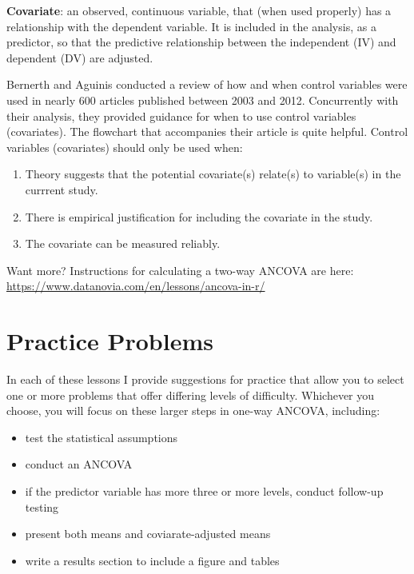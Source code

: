 \documentclass[
  11pt,
]{book}
\providecommand{\tightlist}{%
  \setlength{\itemsep}{0pt}\setlength{\parskip}{0pt}}
\begin{document}
\textbf{Covariate}: an observed, continuous variable, that (when used properly) has a relationship with the dependent variable. It is included in the analysis, as a predictor, so that the predictive relationship between the independent (IV) and dependent (DV) are adjusted.

Bernerth and Aguinis \citeyearpar{bernerth_critical_2016} conducted a review of how and when control variables were used in nearly 600 articles published between 2003 and 2012. Concurrently with their analysis, they provided guidance for when to use control variables (covariates). The flowchart that accompanies their article is quite helpful. Control variables (covariates) should only be used when:

\begin{enumerate}
\def\labelenumi{\arabic{enumi}.}
\tightlist
\item
  Theory suggests that the potential covariate(s) relate(s) to variable(s) in the currrent study.
\item
  There is empirical justification for including the covariate in the study.
\item
  The covariate can be measured reliably.
\end{enumerate}

Want more? Instructions for calculating a two-way ANCOVA are here: \url{https://www.datanovia.com/en/lessons/ancova-in-r/}

\hypertarget{practice-problems-8}{%
\section{Practice Problems}\label{practice-problems-8}}

In each of these lessons I provide suggestions for practice that allow you to select one or more problems that offer differing levels of difficulty. Whichever you choose, you will focus on these larger steps in one-way ANCOVA, including:

\begin{itemize}
\tightlist
\item
  test the statistical assumptions
\item
  conduct an ANCOVA
\item
  if the predictor variable has more three or more levels, conduct follow-up testing
\item
  present both means and coviarate-adjusted means
\item
  write a results section to include a figure and tables
\end{itemize}
\end{document}
